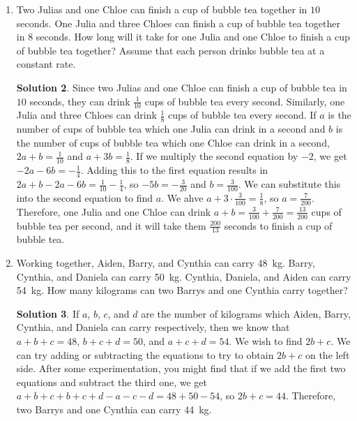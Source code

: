 \documentclass{article}
\theoremstyle{definition}
\newtheorem*{solution}{Solution}
\begin{document}
\begin{enumerate}
\begin{solution}
            To solve this using a system of equations, let $a$ be the number of correctly answered questions and let $b$ be the number of incorrectly answered questions. $a + b = 50$ and $5a - b = 184$. If we add the two equations, we get $a + b + 5a - b = 50 + 184$, so $6a = 234$ and $a = 39$.
        \end{solution}
        \item Two Julias and one Chloe can finish a cup of bubble tea together in $10$ seconds. One Julia and three Chloes can finish a cup of bubble tea together in $8$ seconds. How long will it take for one Julia and one Chloe to finish a cup of bubble tea together? Assume that each person drinks bubble tea at a constant rate.
        \begin{solution}
            Since two Julias and one Chloe can finish a cup of bubble tea in $10$ seconds, they can drink $\frac{1}{10}$ cups of bubble tea every second. Similarly, one Julia and three Chloes can drink $\frac{1}{8}$ cups of bubble tea every second. If $a$ is the number of cups of bubble tea which one Julia can drink in a second and $b$ is the number of cups of bubble tea which one Chloe can drink in a second, $2a + b = \frac{1}{10}$ and $a + 3b = \frac{1}{8}$. If we multiply the second equation by $-2$, we get $-2a - 6b = -\frac{1}{4}$. Adding this to the first equation results in $2a + b - 2a - 6b = \frac{1}{10} - \frac{1}{4}$, so $-5b = -\frac{3}{20}$ and $b = \frac{3}{100}$. We can substitute this into the second equation to find $a$. We ahve $a + 3 \cdot \frac{3}{100} = \frac{1}{8}$, so $a = \frac{7}{200}$. Therefore, one Julia and one Chloe can drink $a + b = \frac{3}{100} + \frac{7}{200} = \frac{13}{200}$ cups of bubble tea per second, and it will take them $\frac{200}{13}$ seconds to finish a cup of bubble tea.
        \end{solution}
        \item Working together, Aiden, Barry, and Cynthia can carry \SI{48}{\kilogram}. Barry, Cynthia, and Daniela can carry \SI{50}{\kilogram}. Cynthia, Daniela, and Aiden can carry \SI{54}{\kilogram}. How many kilograms can two Barrys and one Cynthia carry together?
        \begin{solution}
            If $a$, $b$, $c$, and $d$ are the number of kilograms which Aiden, Barry, Cynthia, and Daniela can carry respectively, then we know that $a + b + c = 48$, $b + c + d = 50$, and $a + c + d = 54$. We wish to find $2b + c$. We can try adding or subtracting the equations to try to obtain $2b + c$ on the left side. After some experimentation, you might find that if we add the first two equations and subtract the third one, we get $a + b + c + b + c + d - a - c - d = 48 + 50 - 54$, so $2b + c = 44$. Therefore, two Barrys and one Cynthia can carry \SI{44}{\kilogram}.


\end{solution}
\end{enumerate}
\end{document}
